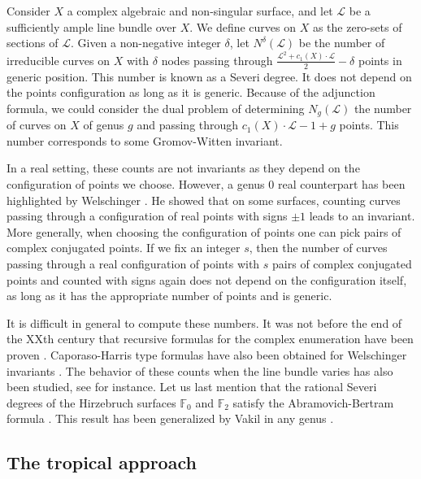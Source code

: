 \documentclass[11pt]{article}
\theoremstyle{definition}
\numberwithin{equation}{section}
\newcommand{\FF}{\mathbb{F}}
\newcommand{\calL}{\mathcal{L}}
\theoremstyle{plain}
\begin{document}
Consider $X$ a complex algebraic and non-singular surface, and let $\calL$ be a sufficiently ample line bundle over $X$. We define curves on $X$ as the zero-sets of sections of $\calL$. Given a non-negative integer $\delta$, let $N^\delta(\calL)$ be the number of irreducible curves on $X$ with $\delta$ nodes passing through $\frac{\calL^2 + c_1(X)\cdot\calL}{2}-\delta$ points in generic position. This number is known as a Severi degree. It does not depend on the points configuration as long as it is generic. Because of the adjunction formula, we could consider the dual problem of determining $N_g(\calL)$ the number of curves on $X$ of genus $g$ and passing through $c_1(X)\cdot\calL-1+g$ points. This number corresponds to some Gromov-Witten invariant.

In a real setting, these counts are not invariants as they depend on the configuration of points we choose. However, a genus $0$ real counterpart has been highlighted by Welschinger \cite{welschinger_invariants_2005}. 
He showed that on some surfaces, counting curves passing through a configuration of real points with signs $\pm 1$ leads to an invariant.
More generally, when choosing the configuration of points one can pick pairs of complex conjugated points. If we fix an integer $s$, then the number of curves passing through a real configuration of points with $s$ pairs of complex conjugated points and counted with signs again does not depend on the configuration itself, as long as it has the appropriate number of points and is generic.

It is difficult in general to compute these numbers. It was not before the end of the XXth century that recursive formulas for the complex enumeration have been proven \cite{kontsevich_gromov-witten_1994,caporaso_counting_1998}. Caporaso-Harris type formulas have also been obtained for Welschinger invariants \cite{itenberg-2009-caporaso}.
 The behavior of these counts when the line bundle varies has also been studied, see \cite{di_francesco_quantum_1995, gottsche_conjectural_1998, fomin_labeled_2010, tzeng_proof_2012}  for instance.
Let us last mention that the rational Severi degrees of the Hirzebruch surfaces $\FF_0$ and $\FF_2$ satisfy the Abramovich-Bertram formula \cite{abramovich-2001-formula}. This result has been generalized by Vakil in any genus \cite{vakil-2000-counting}.

\subsection{The tropical approach} \label{sec-trop-enumgeom}
\end{document}
